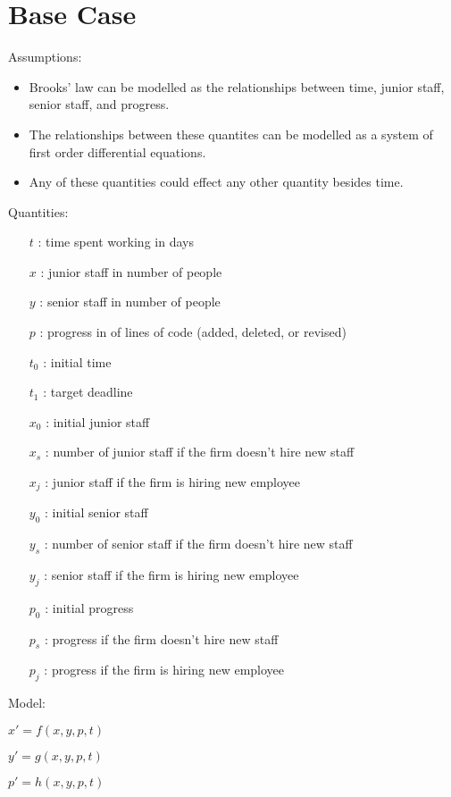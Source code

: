 \documentclass{article}
\newenvironment{atomize}
    {\begin{list} {} {
            \setlength\itemindent{0pt}
            \setlength\leftmargin{10pt}
            \setlength\labelwidth{0pt}
    }}
    {\end{list}}
\begin{document}
\section*{Base Case}
    \begin{atomize}
        \item Assumptions:
            \begin{itemize}
				\item Brooks' law can be modelled as the relationships between
				time, junior staff, senior staff, and progress.
				\item The relationships between these quantites can be modelled
				as a system of first order differential equations.
				\item Any of these quantities could effect any other quantity
								besides time.  
								\end{itemize}
        \item Quantities:
            \begin{itemize}
                \item [$t$]: time spent working in days
                \item [$x$]: junior staff in number of people
                \item [$y$]: senior staff in number of people
                \item [$p$]: progress in of lines of code (added, deleted, or revised)
				\item [$t_{0}$]: initial time
				\item [$t_{1}$]: target deadline
				\item [$x_{0}$]: initial junior staff
				\item [$x_{s}$]: number of junior staff if the firm doesn't hire new staff
				\item [$x_{j}$]: junior staff if the firm is hiring new employee
				\item [$y_{0}$]: initial senior staff
				\item [$y_{s}$]: number of senior staff if the firm doesn't hire new staff
				\item [$y_{j}$]: senior staff if the firm is hiring new employee
				\item [$p_{0}$]: initial progress
				\item [$p_{s}$]: progress if the firm doesn't hire new staff
				\item [$p_{j}$]: progress if the firm is hiring new employee
								
            \end{itemize}
        \item Model:
            \begin{atomize}
                \item $x\prime = f\left(x, y, p, t\right)$
                \item $y\prime = g\left(x, y, p, t\right)$
                \item $p\prime = h\left(x, y, p, t\right)$
            \end{atomize}
    \end{atomize}
\end{document}
